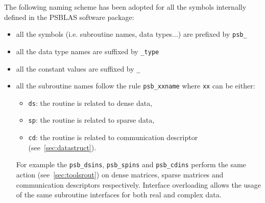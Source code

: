 The following naming scheme has been adopted for all the symbols
internally defined in the PSBLAS software package:
\begin{itemize}
\item all the symbols (i.e. subroutine names, data types...) are
  prefixed by \verb|psb_| 
\item all the data type names are suffixed by \verb|_type|
\item all the constant values are suffixed by \verb|_|
\item all the subroutine names follow the rule \verb|psb_xxname| where
  \verb|xx| can be either:
  \begin{itemize}
  \item \verb|ds|: the routine is related to dense data, 
  \item \verb|sp|: the routine is related to sparse data, 
  \item \verb|cd|: the routine is related to communication descriptor (see~\ref{sec:datastruct}).
  \end{itemize}
  For example the \verb|psb_dsins|, \verb|psb_spins| and
  \verb|psb_cdins| perform the same action (see~\ref{sec:toolsrout}) on
  dense matrices, sparse matrices and communication descriptors
  respectively.
  Interface overloading allows the usage of the same subroutine
  interfaces for both real and complex data.
\end{itemize}

